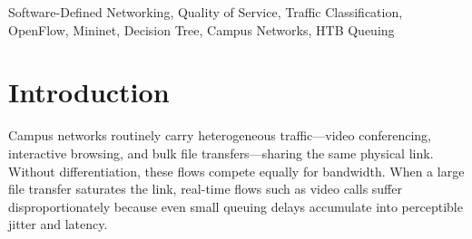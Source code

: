 \documentclass[conference]{IEEEtran}
\begin{document}
\begin{abstract}
On a shared campus network link, video-conferencing traffic and
large-file downloads are treated identically by default. Under
contention the video call degrades—dropped frames and lag—even
though it is far more delay-sensitive than the download. We propose
and evaluate a Software-Defined Networking (SDN) system that
automatically classifies network flows by their observed packet-level
behavior and enforces differentiated Quality-of-Service (QoS) without
manual configuration or static IP/port rules. A shallow decision-tree
classifier extracts six behavioral features per 20-packet window and
assigns each flow to one of three service tiers (real-time, best-effort,
bulk). An os-ken/OpenFlow~1.3 controller then maps classified flows to
Linux-HTB queues with guaranteed minimum bandwidth floors (6/2/1~Mbps)
and borrowable ceilings (10/8/10~Mbps), following a starvation-safe
design that prevents lower-priority traffic from being completely starved.
A React/Node.js dashboard provides live per-tier monitoring and an
on/off control. Evaluation in a Mininet-emulated topology demonstrates
an 84\% reduction in real-time jitter (5.11~ms to 0.84~ms) and a
classifier holdout accuracy of 97.6\% on 288 fresh balanced samples,
with zero realtime packet loss. Source code is available at
\url{https://github.com/YazheneS/priority-based-network-trafficing}.
\end{abstract}

\begin{IEEEkeywords}
Software-Defined Networking, Quality of Service, Traffic Classification,
OpenFlow, Mininet, Decision Tree, Campus Networks, HTB Queuing
\end{IEEEkeywords}

\section{Introduction}
\label{sec:intro}

Campus networks routinely carry heterogeneous traffic—video
conferencing, interactive browsing, and bulk file transfers—sharing
the same physical link. Without differentiation, these flows compete
equally for bandwidth. When a large file transfer saturates the link,
real-time flows such as video calls suffer disproportionately because
even small queuing delays accumulate into perceptible jitter and
latency.
\end{document}
